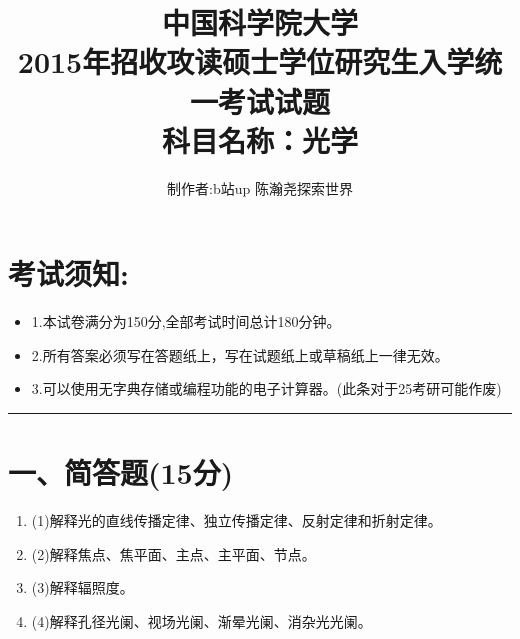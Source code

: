 \documentclass[11pt,a4paper]{article}
\begin{document}
    \title{中国科学院大学\\2015年招收攻读硕士学位研究生入学统一考试试题\\科目名称：光学}
    \author{制作者:b站up 陈瀚尧探索世界}
    \date{}
    \maketitle
    \titleformat{\section}[block]{\normalfont\Large\bfseries}{}{0pt}{}


    \section{考试须知:}
    \begin{itemize}[topsep=0pt,itemsep=0pt,partopsep=0pt]
        \item 1.本试卷满分为150分,全部考试时间总计180分钟。
        \vspace{-3mm}
        \item 2.所有答案必须写在答题纸上，写在试题纸上或草稿纸上一律无效。
        \vspace{-3mm}
        \item 3.可以使用无字典存储或编程功能的电子计算器。(此条对于25考研可能作废)
    \end{itemize}
    \vspace{-5mm}
    \noindent\rule{\textwidth}{0.5pt} %
    \vspace{-12mm}
    \section*{一、简答题(15分)}
    \begin{enumerate}
        \vspace{0mm}
        \item (1)解释光的直线传播定律、独立传播定律、反射定律和折射定律。
        \vspace{0mm}
        \item (2)解释焦点、焦平面、主点、主平面、节点。
        \vspace{0mm}
        \item (3)解释辐照度。
        \vspace{0mm}
        \item (4)解释孔径光阑、视场光阑、渐晕光阑、消杂光光阑。
        \vspace{0mm}
    \end{enumerate}
\end{document}
